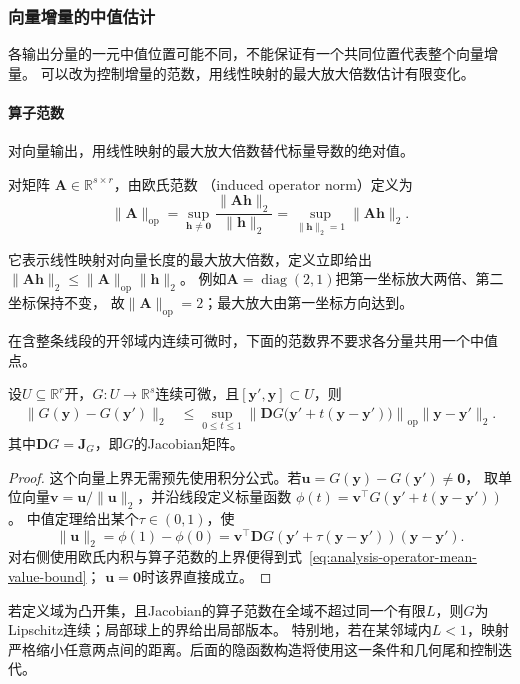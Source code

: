 \subsubsection{向量增量的中值估计}

各输出分量的一元中值位置可能不同，不能保证有一个共同位置代表整个向量增量。
可以改为控制增量的范数，用线性映射的最大放大倍数估计有限变化。

\paragraph{算子范数}

对向量输出，用线性映射的最大放大倍数替代标量导数的绝对值。
\begin{definition}[欧氏诱导算子范数]
\label{def:analysis-induced-operator-norm}
对矩阵
$\bm{A}\in\mathbb{R}^{s\times r}$，由欧氏范数
（induced operator norm）定义为
\[
  \lVert\bm{A}\rVert_{\mathrm{op}}
  =
  \sup_{\bm{h}\neq\bm{0}}
  \frac{\lVert\bm{A}\bm{h}\rVert_2}{\lVert\bm{h}\rVert_2}
  =
  \sup_{\lVert\bm{h}\rVert_2=1}\lVert\bm{A}\bm{h}\rVert_2.
\]
\end{definition}
它表示线性映射对向量长度的最大放大倍数，定义立即给出
$\lVert\bm{A}\bm{h}\rVert_2
\leq\lVert\bm{A}\rVert_{\mathrm{op}}\lVert\bm{h}\rVert_2$。
例如$\bm A=\operatorname{diag}(2,1)$把第一坐标放大两倍、第二坐标保持不变，
故$\lVert\bm A\rVert_{\mathrm{op}}=2$；最大放大由第一坐标方向达到。

在含整条线段的开邻域内连续可微时，下面的范数界不要求各分量共用一个中值点。
\begin{theorem}[向量值函数的中值估计]
\label{thm:multivariable-vector-mean-value}
设$U\subseteq\mathbb R^r$开，$G:U\to\mathbb R^s$连续可微，且$[\bm y',\bm y]\subset U$，则
\begin{equation}
  \begin{aligned}
  \lVert G(\bm{y})-G(\bm{y}')\rVert_2
  &\leq
  \sup_{0\leq t\leq1}
  \left\lVert
    \bm{D}G\bigl(\bm{y}'+t(\bm{y}-\bm{y}')\bigr)
  \right\rVert_{\mathrm{op}}
  \lVert\bm{y}-\bm{y}'\rVert_2.
  \end{aligned}
\label{eq:analysis-operator-mean-value-bound}
\end{equation}
其中$\bm DG=\bm J_G$，即$G$的Jacobian矩阵。
\end{theorem}
\begin{proof}
这个向量上界无需预先使用积分公式。若$\bm u=G(\bm y)-G(\bm y')\neq\bm0$，
取单位向量$\bm v=\bm u/\lVert\bm u\rVert_2$，并沿线段定义标量函数
$\phi(t)=\bm v^\top G(\bm y'+t(\bm y-\bm y'))$。
中值定理给出某个$\tau\in(0,1)$，使
\[
 \lVert\bm u\rVert_2
 =\phi(1)-\phi(0)
 =\bm v^\top\bm DG(\bm y'+\tau(\bm y-\bm y'))(\bm y-\bm y').
\]
对右侧使用欧氏内积与算子范数的上界便得到式~\eqref{eq:analysis-operator-mean-value-bound}；
$\bm u=\bm0$时该界直接成立。
\end{proof}
若定义域为凸开集，且Jacobian的算子范数在全域不超过同一个有限$L$，则$G$为Lipschitz连续；局部球上的界给出局部版本。
特别地，若在某邻域内$L<1$，映射严格缩小任意两点间的距离。后面的隐函数构造将使用这一条件和几何尾和控制迭代。

